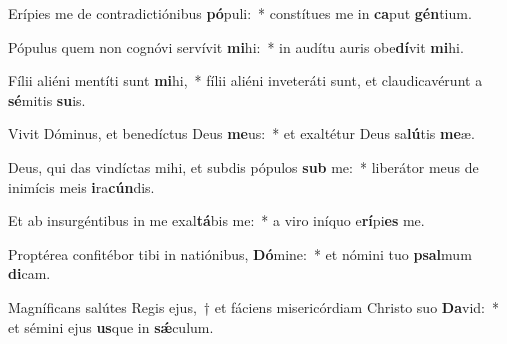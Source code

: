 \item Erípies me de contradictiónibus \textbf{pó}puli:~* constítues me in \textbf{ca}put \textbf{gén}tium.
\item Pópulus quem non cognóvi servívit \textbf{mi}hi:~* in audítu auris obe\textbf{dí}vit \textbf{mi}hi.
\item Fílii aliéni mentíti sunt \textbf{mi}hi,~* fílii aliéni inveteráti sunt, et claudicavérunt a \textbf{sé}mitis \textbf{su}is.
\item Vivit Dóminus, et benedíctus Deus \textbf{me}us:~* et exaltétur Deus sa\textbf{lú}tis \textbf{me}æ.
\item Deus, qui das vindíctas mihi, et subdis pópulos \textbf{sub} me:~* liberátor meus de inimícis meis \textbf{i}ra\textbf{cún}dis.
\item Et ab insurgéntibus in me exal\textbf{tá}bis me:~* a viro iníquo e\textbf{rí}pi\textbf{es} me.
\item Proptérea confitébor tibi in natiónibus, \textbf{Dó}mine:~* et nómini tuo \textbf{psal}mum \textbf{di}cam.
\item Magníficans salútes Regis ejus,~† et fáciens misericórdiam Christo suo \textbf{Da}vid:~* et sémini ejus \textbf{us}que in \textbf{sǽ}culum.
